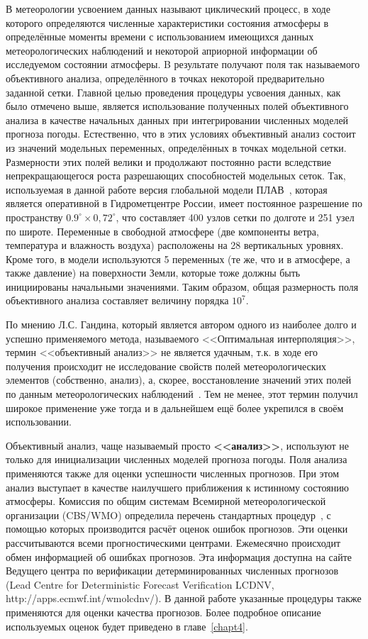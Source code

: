 В метеорологии усвоением данных называют циклический процесс, в ходе которого определяются численные характеристики состояния атмосферы в определённые моменты времени с использованием имеющихся данных метеорологических наблюдений и некоторой априорной информации об исследуемом состоянии атмосферы. B результате получают поля так называемого объективного анализа, определённого в точках некоторой предварительно заданной сетки.
Главной целью проведения процедуры усвоения данных, как было отмечено выше, является использование полученных полей объективного анализа в качестве начальных данных при интегрировании численных моделей прогноза погоды.
Естественно, что в этих условиях объективный анализ состоит из значений модельных переменных, определённых в точках модельной сетки. Размерности этих полей велики и продолжают постоянно расти вследствие непрекращающегося роста разрешающих способностей модельных сеток. Так, используемая в данной работе версия глобальной модели ПЛАВ~\cite{Tolstykh-SLAV}, которая является оперативной в Гидрометцентре России, имеет постоянное разрешение по пространству ${0.9^{\circ}\times0,72^{\circ}}$, что составляет 400 узлов сетки по долготе и 251 узел по широте. Переменные в свободной атмосфере (две компоненты ветра, температура и влажность воздуха) расположены на 28 вертикальных уровнях. Кроме того, в модели используются 5 переменных (те же, что и в атмосфере, а также давление) на поверхности Земли, которые тоже должны быть инициированы начальными значениями. Таким образом, общая размерность поля объективного анализа составляет величину порядка ${10^7}$.

По мнению Л.С. Гандина, который является автором одного из наиболее долго и успешно применяемого метода, называемого <<Оптимальная интерполяция>>, термин <<объективный анализ>> не является удачным, т.к. в ходе его получения происходит не исследование свойств полей метеорологических элементов (собственно, анализ), а, скорее, восстановление значений этих полей по данным метеорологических наблюдений~\cite[с.~5]{Gandin-1963}. Тем не менее, этот термин получил широкое применение уже тогда и в дальнейшем ещё более укрепился в своём использовании.

Объективный анализ, чаще называемый просто \textbf{<<анализ>>}, используют не только для инициализации численных моделей прогноза погоды. Поля анализа применяются также для оценки успешности численных прогнозов. При этом анализ выступает в качестве наилучшего приближения к истинному состоянию атмосферы. Комиссия по общим системам Всемирной метеорологической организации (CBS/WMO) определила перечень стандартных процедур~\cite{WMO-CBS}, с помощью которых производится расчёт оценок ошибок прогнозов. Эти оценки рассчитываются всеми прогностическими центрами. Ежемесячно происходит обмен информацией об ошибках прогнозов. Эта информация доступна на сайте Ведущего центра по верификации детерминированных численных прогнозов (Lead Centre for Deterministic Forecast Verification LCDNV, http://apps.ecmwf.int/wmolcdnv/). В данной работе указанные процедуры также применяются для оценки качества прогнозов. Более подробное описание используемых оценок будет приведено в главе~\ref{chapt4}.

